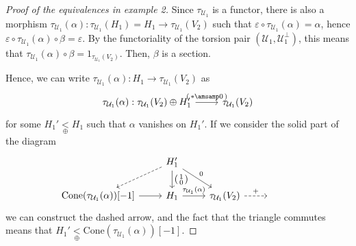 \begin{proof}[Proof of the equivalences in example 2]
  Since $\tau_{\mathcal{U}_1}$ is a functor, there is also a morphism
  $\tau_{\mathcal{U}_1}(\alpha):\tau_{\mathcal{U}_1}(H_1)=H_1\to \tau_{\mathcal{U}_1}(V_2)$ such that
  $\varepsilon\circ\tau_{\mathcal{U}_1}(\alpha)=\alpha$, hence
  $\varepsilon\circ\tau_{\mathcal{U}_1}(\alpha)\circ\beta = \varepsilon$. By the functoriality of
  the torsion pair $(\mathcal{U}_1,\mathcal{U}_1^\perp)$, this means that
  $\tau_{\mathcal{U}_1}(\alpha)\circ\beta=1_{\tau_{\mathcal{U}_1}(V_2)}$. Then, $\beta$ is a section.

  Hence, we can write $\tau_{\mathcal{U}_1}(\alpha):H_1\to \tau_{\mathcal{U}_1}(V_2)$
  as
  \begin{equation*}
    \begin{tikzcd}
      \tau_{\mathcal{U}_1}(\alpha):\tau_{\mathcal{U}_1}(V_2)\oplus H_1'
      \arrow{r}{
          \begin{psmallmatrix}
            \ast \amsamp 0
          \end{psmallmatrix}
          }
        & \tau_{\mathcal{U}_1}(V_2)
    \end{tikzcd}
  \end{equation*}
  for some $H_1'\underset{\oplus}{<} H_1$ such that
  $\alpha$ vanishes on $H_1'$. If we consider the solid part of the diagram
  \begin{equation*}
    \begin{tikzcd}
      & H_1'\arrow[dashed]{dl}
      \arrow{d}{
        \begin{psmallmatrix}
          1 \\ 0
        \end{psmallmatrix}
      }\arrow{dr}{0}
        & & &\\
      \mathrm{Cone}(\tau_{\mathcal{U}_1}(\alpha))[-1]\arrow{r}
        & H_1\arrow{r}{\tau_{\mathcal{U}_1}(\alpha)}
          & \tau_{\mathcal{U}_1}(V_2)\arrow[dashed]{r}{+}
            & {}
    \end{tikzcd}
  \end{equation*}
  we can construct the dashed arrow, and the fact that the triangle commutes means
  that $H_1'\underset{\oplus}{<}\mathrm{Cone}(\tau_{\mathcal{U}_1}(\alpha))[-1]$.


\end{proof}
